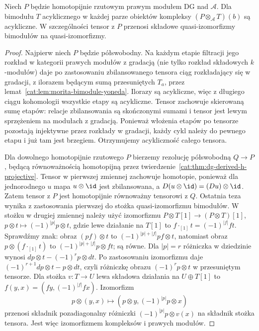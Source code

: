 \begin{lemat}\label{cat:lem:morita-hflat}
Niech $P$ będzie homotopijnie rzutowym prawym modułem DG nad $\mathcal A$. Dla bimodułu $T$ acyklicznego w każdej parze obiektów kompleksy $(P\otimes_{\mathcal A}T)(b)$ są acykliczne. W szczególności tensor z $P$ przenosi składowe quasi-izomorfizmy bimodułów na quasi-izomorfizmy.
\end{lemat}
\begin{proof}
Najpierw niech $P$ będzie półswobodny. Na każdym etapie filtracji jego rozkład w kategorii prawych modułów z gradacją (nie tylko rozkład składowych $k$-modułów) daje po zastosowaniu zbilansowanego tensora ciąg rozkładający się w gradacji, z ilorazem będącym sumą przesuniętych $T_a$, przez lemat~\ref{cat:lem:morita-bimodule-yoneda}. Ilorazy są acykliczne, więc z długiego ciągu kohomologii wszystkie etapy są acykliczne. Tensor zachowuje skierowaną sumę etapów: relacje zbilansowania są skończonymi sumami i tensor jest lewym sprzężeniem na modułach z gradacją. Ponieważ włożenia etapów po tensorze pozostają injektywne przez rozkłady w gradacji, każdy cykl należy do pewnego etapu i już tam jest brzegiem. Otrzymujemy acykliczność całego tensora.

Dla dowolnego homotopijnie rzutowego $P$ bierzemy rezolucję półswobodną $Q\to P$, będącą równoważnością homotopijną przez twierdzenie~\ref{cat:thm:dg-derived-h-projective}. Tensor w pierwszej zmiennej zachowuje homotopie, ponieważ dla jednorodnego $u$ mapa $u\otimes\id$ jest zbilansowana, a $D(u\otimes\id)=(Du)\otimes\id$. Zatem tensor z $P$ jest homotopijnie równoważny tensorowi z $Q$. Ostatnia teza wynika z zastosowania pierwszej do stożka quasi-izomorfizmu bimodułów. W stożku w drugiej zmiennej należy użyć izomorfizmu $P\otimes T[1]\to(P\otimes T)[1]$, $p\otimes t\mapsto(-1)^{|p|}p\otimes t$, gdzie lewe działanie na $T[1]$ to $f\cdot_{[1]}t=(-1)^{|f|}ft$. Sprawdźmy znak: obraz $(pf)\otimes t$ to $(-1)^{|p|+|f|}pf\otimes t$, natomiast obraz $p\otimes(f\cdot_{[1]}t)$ to $(-1)^{|p|+|f|}p\otimes ft$; są równe. Dla $|p|=r$ różniczka w dziedzinie wynosi $dp\otimes t-(-1)^rp\otimes dt$. Po zastosowaniu izomorfizmu daje $(-1)^{r+1}dp\otimes t-p\otimes dt$, czyli różniczkę obrazu $(-1)^rp\otimes t$ w przesuniętym tensorze. Dla stożka $v:T\to U$ lewa składowa działania na $U\oplus T[1]$ to $f(y,x)=(fy,(-1)^{|f|}fx)$. Izomorfizm
\[
 p\otimes(y,x)\longmapsto(p\otimes y,(-1)^{|p|}p\otimes x)
\]
przenosi składnik pozadiagonalny różniczki $(-1)^{|p|}p\otimes v(x)$ na składnik stożka tensora. Jest więc izomorfizmem kompleksów i prawych modułów.
\end{proof}

